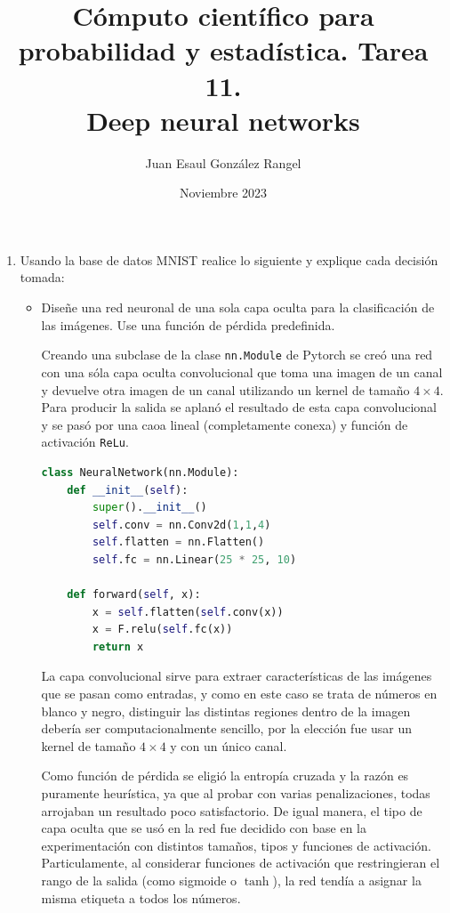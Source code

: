 \documentclass{article}
\title{Cómputo científico para probabilidad y estadística. Tarea 11.\\
Deep neural networks}
\author{Juan Esaul González Rangel}
\date{Noviembre 2023}
\begin{document}
\maketitle


\begin{enumerate}

    \item Usando la base de datos MNIST realice lo siguiente y explique cada decisión tomada:

    \begin{itemize}
        \item Diseñe una red neuronal de una sola capa oculta para la clasificación de las imágenes. Use una función de pérdida predefinida.
        


        Creando una subclase de la clase \texttt{nn.Module} de Pytorch se creó una
        red con una sóla capa oculta convolucional que toma una imagen de un canal
        y devuelve otra imagen de un canal utilizando un kernel de tamaño $4\times4$.
        Para producir la salida se aplanó el resultado de esta capa convolucional y
        se pasó por una caoa lineal (completamente conexa) y función de activación 
        \texttt{ReLu}. 

        \begin{lstlisting}[language=Python]
class NeuralNetwork(nn.Module):
    def __init__(self):
        super().__init__()
        self.conv = nn.Conv2d(1,1,4)
        self.flatten = nn.Flatten()
        self.fc = nn.Linear(25 * 25, 10)

    def forward(self, x):
        x = self.flatten(self.conv(x))
        x = F.relu(self.fc(x))
        return x \end{lstlisting}
        
        La capa convolucional sirve para extraer características de 
        las imágenes que se pasan como entradas, y como en este caso se trata de 
        números en blanco y negro, distinguir las distintas regiones dentro de la imagen
        debería ser computacionalmente sencillo, por la elección fue usar un kernel de tamaño
        $4\times4$ y con un único canal.

        Como función de pérdida se eligió la entropía cruzada y la razón es puramente
        heurística, ya que al probar con varias penalizaciones, todas arrojaban un resultado
        poco satisfactorio. De igual manera, el tipo de capa oculta que se usó en la red
        fue decidido con base en la experimentación con distintos tamaños, tipos y funciones
        de activación. Particulamente, al considerar funciones de activación que restringieran
        el rango de la salida (como sigmoide o $\tanh$), la red tendía a asignar la misma 
        etiqueta a todos los números.


\end{itemize}
\end{enumerate}
\end{document}
